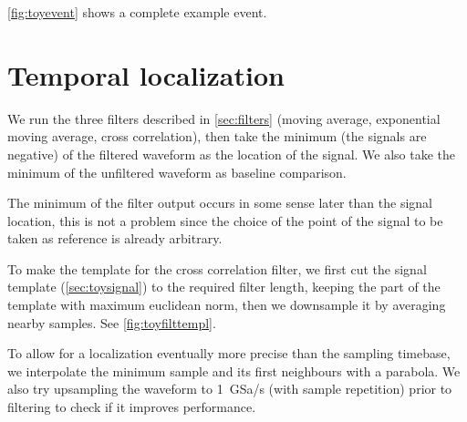 \autoref{fig:toyevent} shows a complete example event.

\begin{figure}
    

\end{figure}

\section{Temporal localization}

We run the three filters described in \autoref{sec:filters} (moving
average, exponential moving average, cross correlation), then take the minimum
(the signals are negative) of the filtered waveform as the location of the
signal. We also take the minimum of the unfiltered waveform as baseline
comparison.

The minimum of the filter output occurs in some sense later than the signal
location, this is not a problem since the choice of the point of the signal to
be taken as reference is already arbitrary.

To make the template for the cross correlation filter, we first cut the signal
template (\autoref{sec:toysignal}) to the required filter length, keeping
the part of the template with maximum euclidean norm, then we downsample it by
averaging nearby samples. See \autoref{fig:toyfilttempl}.

\begin{figure}
    

\end{figure}

To allow for a localization eventually more precise than the sampling timebase,
we interpolate the minimum sample and its first neighbours with a parabola. We
also try upsampling the waveform to \SI{1}{GSa/s} (with sample repetition)
prior to filtering to check if it improves performance.

